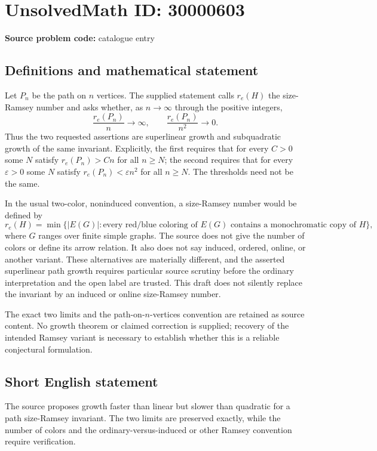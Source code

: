 \documentclass[11pt]{article}
\begin{document}
\section*{UnsolvedMath ID: 30000603}
\textbf{Source problem code:} catalogue entry
\subsection{Definitions and mathematical statement}
Let $P_n$ be the path on $n$ vertices. The supplied statement calls $r_e(H)$ the size-Ramsey number and asks whether, as $n\to\infty$ through the positive integers,
\[
 \frac{r_e(P_n)}n\longrightarrow\infty,
 \qquad
 \frac{r_e(P_n)}{n^2}\longrightarrow0.
\]
Thus the two requested assertions are superlinear growth and subquadratic growth of the same invariant. Explicitly, the first requires that for every $C>0$ some $N$ satisfy $r_e(P_n)>Cn$ for all $n\ge N$; the second requires that for every $\varepsilon>0$ some $N$ satisfy $r_e(P_n)<\varepsilon n^2$ for all $n\ge N$. The thresholds need not be the same.

In the usual two-color, noninduced convention, a size-Ramsey number would be defined by
\[
 r_e(H)=\min\{|E(G)|:\text{every red/blue coloring of }E(G)
              \text{ contains a monochromatic copy of }H\},
\]
where $G$ ranges over finite simple graphs. The source does not give the number of colors or define its arrow relation. It also does not say induced, ordered, online, or another variant. These alternatives are materially different, and the asserted superlinear path growth requires particular source scrutiny before the ordinary interpretation and the open label are trusted. This draft does not silently replace the invariant by an induced or online size-Ramsey number.

The exact two limits and the path-on-$n$-vertices convention are retained as source content. No growth theorem or claimed correction is supplied; recovery of the intended Ramsey variant is necessary to establish whether this is a reliable conjectural formulation.
\subsection{Short English statement}
The source proposes growth faster than linear but slower than quadratic for a path size-Ramsey invariant. The two limits are preserved exactly, while the number of colors and the ordinary-versus-induced or other Ramsey convention require verification.
\end{document}
